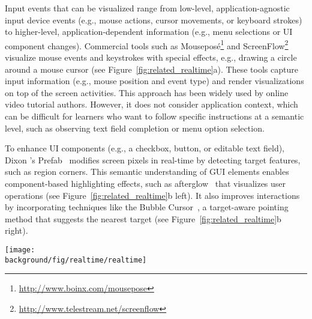 Input events that can be visualized range from low-level, application-agnostic input device events (e.g., mouse actions, cursor movements, or keyboard strokes) to higher-level, application-dependent information (e.g., menu selections or UI component changes).
%
Commercial tools such as Mouseposé\footnote{\url{http://www.boinx.com/mousepose}} and ScreenFlow\footnote{\url{http://www.telestream.net/screenflow}} visualize mouse events and keystrokes with special effects, e.g., drawing a circle around a mouse cursor (see Figure~\ref{fig:related_realtime}a). These tools capture input information (e.g., mouse position and event type) and render visualizations on top of the screen activities. This approach has been widely used by online video tutorial authors. However, it does not consider application context, which can be difficult for learners who want to follow specific instructions at a semantic level, such as observing text field completion or menu option selection.

To enhance UI components (e.g., a checkbox, button, or editable text field), Dixon \ea{}'s Prefab~\cite{Dixon:2010fb,Dixon:2011:CHP:1978942.1979086} modifies screen pixels in real-time by detecting target features, such as region corners. This semantic understanding of GUI elements enables component-based highlighting effects, such as afterglow~\cite{Baudisch:2006:PET:1166253.1166280} that visualizes user operations (see Figure~\ref{fig:related_realtime}b left). It also improves interactions by incorporating techniques like the Bubble Cursor~\cite{Grossman:2005:BCE:1054972.1055012}, a target-aware pointing method that suggests the nearest target (see Figure~\ref{fig:related_realtime}b right).

\begin{figure*}[t!]
  \centering
  \texttt{[image: \\background/fig/realtime/realtime]}
  \caption{Real-time visual enhancements to GUI applications are commonly used in instructional videos. a) Mouseposé highlights a mouse cursor (left) and displays keyboard input (right). b) Prefab~\cite{Dixon:2010fb} creates effects such as target-agnostic afterglow~\cite{Baudisch:2006:PET:1166253.1166280} (left) and target-aware cursor~\cite{Grossman:2005:BCE:1054972.1055012} (right) by identifying and reverse engineering UI components.}
  \label{fig:related_realtime}
\end{figure*}

